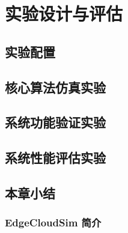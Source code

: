 \chapter{实验设计与评估}

\section{实验配置}

\section{核心算法仿真实验}

\section{系统功能验证实验}

\section{系统性能评估实验}

\section{本章小结}

\subsection{EdgeCloudSim 简介}

